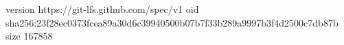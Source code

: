 version https://git-lfs.github.com/spec/v1
oid sha256:23f28ec0373fcea89a30d6c39940500b07b7f33b289a9997b3f4d2500c7db87b
size 167858
